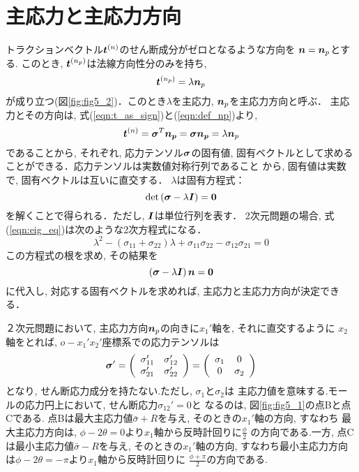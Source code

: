 \documentclass[10pt,a4j]{jarticle}
\begin{document}
\section{主応力と主応力方向}
トラクションベクトル$\mbox{\boldmath $t$}^{(n)}$のせん断成分がゼロとなるような方向を
$\mbox{\boldmath $n$}=\mbox{\boldmath $n$}_p$とする. このとき, $\mbox{\boldmath $t$}^{(n_p)}$は法線方向性分のみを持ち, 
\begin{equation}
	\mbox{\boldmath $t$}^{(n_p)}=\lambda \mbox{\boldmath $n$}_p
	\label{eqn:def_np}
\end{equation}
が成り立つ(図\ref{fig:fig5_2})．このとき$\lambda$を主応力, $\mbox{\boldmath $n$}_p$を主応力方向と呼ぶ．
主応力とその方向は, 式(\ref{eqn:t_as_sign})と(\ref{eqn:def_np})より, 
\begin{equation}
	\mbox{\boldmath $t$}^{(n)}
	=\mbox{\boldmath $\sigma$}^T \mbox{\boldmath $n_p$} 
	=\mbox{\boldmath $\sigma$}\mbox{\boldmath $n_p$} 
	=\lambda \mbox{\boldmath $n$}_p
\end{equation}
であることから, それぞれ, 応力テンソル$\mbox{\boldmath $\sigma$}$の固有値, 
固有ベクトルとして求めることができる．応力テンソルは実数値対称行列であること
から, 固有値は実数で, 固有ベクトルは互いに直交する．
$\lambda$は固有方程式：
\begin{equation}
	{\rm det} \left( \mbox{\boldmath $\sigma$}- \lambda \mbox{\boldmath $I$} \right) =\mbox{\boldmath $0$} 
	\label{eqn:eig_eq}
\end{equation}
を解くことで得られる．ただし, $\mbox{\boldmath $I$}$は単位行列を表す．
2次元問題の場合, 式(\ref{eqn:eig_eq})は次のような2次方程式になる．
\begin{equation}
	\lambda^2 -\left( \sigma_{11}+\sigma_{22}\right)\lambda + 
	\sigma_{11}\sigma_{22}-\sigma_{12}\sigma_{21}=0
	\label{eqn:eig_eq_2d}
\end{equation}
この方程式の根を求め, その結果を
\begin{equation}
	\left( \mbox{\boldmath $\sigma$} -\lambda \mbox{\boldmath $I$} \right) \mbox{\boldmath $n$}=\mbox{\boldmath $0$}
\end{equation}
に代入し, 対応する固有ベクトルを求めれば, 主応力と主応力方向が決定できる．

２次元問題において, 主応力方向$\mbox{\boldmath $n$}_p$の向きに$x_1'$軸を, それに直交するように
$x_2$軸をとれば, $o-x_1'x_2'$座標系での応力テンソルは
\begin{equation}
	\mbox{\boldmath $\sigma$}'
	=
	\left(
	\begin{array}{cc}
		\sigma_{11}' & \sigma_{12}' \\
		\sigma_{21}' & \sigma_{22}' 
	\end{array}
	\right)
	=
	\left(
	\begin{array}{cc}
		\sigma_1 & 0 \\
		0 & \sigma_2
	\end{array}
	\right)
\end{equation}
となり, せん断応力成分を持たない.ただし, $\sigma_1$と$\sigma_2$は
主応力値を意味する.モールの応力円上において, せん断応力$\sigma_{12}'=0$と
なるのは, 図\ref{fig:fig5_1}の点Bと点Cである.
点Bは最大主応力値$\bar{\sigma}+R$を与え, そのときの$x_1'$軸の方向, すなわち
最大主応力方向は, $\phi -2 \theta =0 $より$x_1$軸から反時計回りに$\frac{\phi}{2}$
の方向である.一方, 点Cは最小主応力値$\bar{\sigma}-R$を与え, そのときの$x_1'$軸の方向, 
すなわち最小主応力方向は$\phi -2 \theta =- \pi $より$x_1$軸から反時計回りに
$\frac{\phi+\pi}{2}$の方向である.
\end{document}
